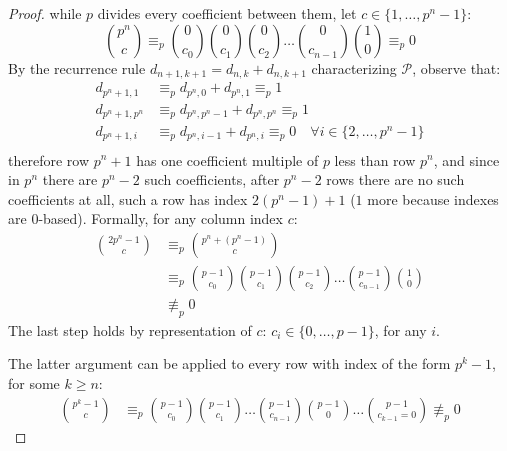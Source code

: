 \documentclass[11pt,a4paper]{article} %
\begin{document}
\begin{proof}
      while $p$ divides every coefficient between them, let
      $c\in\lbrace1,\ldots, p^n-1 \rbrace$:
      \begin{displaymath}
        {{p^n} \choose {c}} \equiv_{p} {{0} \choose {c_0}} {{0} \choose {c_1}}{{0} \choose {c_2}} \ldots 
        {{0} \choose {c_{n-1}}}{{1} \choose {0}} \equiv_{p} 0
      \end{displaymath}
      By the recurrence rule $d_{n+1, k+1} = d_{n, k} + d_{n, k+1}$
      characterizing $\mathcal{P}$, observe that:
      \begin{displaymath}
        \begin{split}
          d_{p^n+1, 1} &\equiv_{p} d_{p^n, 0} + d_{p^n, 1}\equiv_{p} 1 \\
          d_{p^n+1, p^n} &\equiv_{p} d_{p^n, p^n-1} + d_{p^n, p^n}\equiv_{p} 1 \\
          d_{p^n+1, i} &\equiv_{p} d_{p^n, i-1} + d_{p^n, i}\equiv_{p} 0 \quad \forall i \in \lbrace 2, \ldots, p^n -1\rbrace \\
        \end{split}
      \end{displaymath}
      therefore row $p^n + 1$ has one coefficient multiple of $p$ less
      than row $p^n$, and since in $p^n$ there are $p^n-2$ such
      coefficients, after $p^n-2$ rows there are no such coefficients
      at all, such a row has index $2(p^n -1)+1$ ($1$ more because
      indexes are $0$-based). Formally, for any column index $c$:
      \begin{displaymath}
        \begin{split}
          {{2p^n - 1} \choose {c}} &\equiv_{p} {{p^n +(p^n- 1)} \choose {c}} \\
          &\equiv_{p} {{p-1} \choose {c_0}} {{p-1} \choose {c_1}}{{p-1} \choose {c_2}} \ldots 
          {{p-1} \choose {c_{n-1}}}{{1} \choose {0}} \\
          &\not\equiv_{p} 0
        \end{split}
      \end{displaymath}
      The last step holds by representation of $c$:
      $c_i \in \lbrace 0, \ldots, p-1 \rbrace$, for any $i$.

      The latter argument can be applied to every row with index of
      the form $p^k -1$, for some $k\geq n$:
      \begin{displaymath}
        \begin{split}
          {{p^k-1} \choose {c}} &\equiv_{p} {{p-1} \choose {c_0}} {{p-1} \choose {c_1}} \ldots 
          {{p-1} \choose {c_{n-1}}}{{p-1} \choose {0}}\ldots{{p-1} \choose {c_{k-1}=0}} \not\equiv_{p} 0
        \end{split}
      \end{displaymath}


\end{proof}
\end{document}
